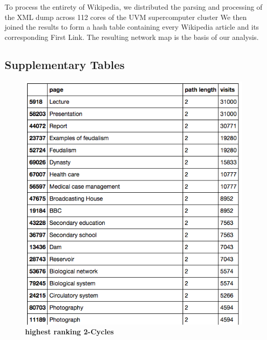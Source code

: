 \documentclass[pre,twocolumn,twoside,superscriptaddress,floatfix, aps, 10pt]{revtex4-1}
\begin{document}
To process the entirety of Wikipedia, we distributed the parsing and processing of the XML dump
across 112 cores of the UVM supercomputer cluster
\cite{vacc}
We then joined the results to form a hash table containing every Wikipedia article and its corresponding
First Link. The resulting network map is the basis of our analysis.


\subsection*{Supplementary Tables}

\begin{figure}[tp!]
  \centering	
  \includegraphics[width=\columnwidth]{graphics/top_2loops.png}
  \caption{
    \textbf{highest ranking 2-Cycles}
  }
  \label{fig:Highest Ranking 2-Cyles}
\end{figure}
\end{document}
